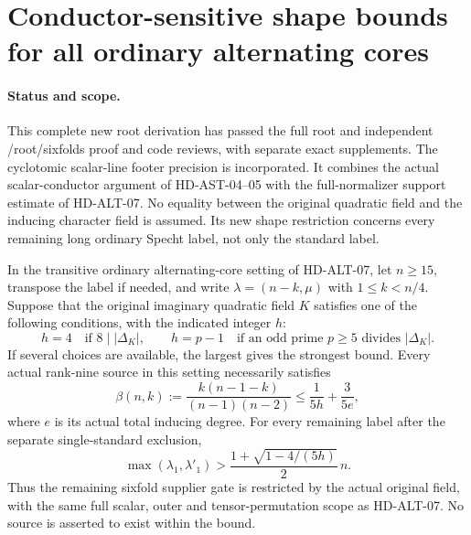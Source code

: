 \section{Conductor-sensitive shape bounds for all ordinary alternating cores}
\label{sec:ordinary-alternating-conductor}

\paragraph{Status and scope.}
This complete new root derivation has passed the full root and
independent /root/sixfolds proof and code reviews, with separate exact
supplements. The cyclotomic scalar-line footer precision is incorporated. It combines the actual scalar-conductor argument of HD-AST-04--05
with the full-normalizer support estimate of HD-ALT-07. No equality
between the original quadratic field and the inducing character field
is assumed. Its new shape restriction concerns every remaining long
ordinary Specht label, not only the standard label.

\begin{theorem}
\label{HD-ALT-08}
In the transitive ordinary alternating-core setting of HD-ALT-07, let
$n\ge15$, transpose the label if needed, and write
$\lambda=(n-k,\mu)$ with $1\le k<n/4$.
Suppose that the original imaginary quadratic field $K$ satisfies
one of the following conditions, with the indicated integer $h$:
\[
 h=4\quad\text{if }8\mid|\Delta_K|,
 \qquad h=p-1\quad\text{if an odd prime }p\ge5
                         \text{ divides }|\Delta_K|.
 \tag{AC.1}
\]
If several choices are available, the largest gives the strongest bound.
Every actual rank-nine source in this setting necessarily satisfies
\[
 \beta(n,k):=\frac{k(n-1-k)}{(n-1)(n-2)}
                     \le\frac1{5h}+\frac3{5e},
 \tag{AC.2}
\]
where $e$ is its actual total inducing degree.
For every remaining label after the separate single-standard exclusion,
\[
 \max(\lambda_1,\lambda'_1)>
          \frac{1+\sqrt{1-4/(5h)}}2\,n.
 \tag{AC.3}
\]
Thus the remaining sixfold supplier gate is restricted by the actual
original field, with the same full scalar, outer and tensor-permutation
scope as HD-ALT-07. No source is asserted to exist within the bound.
\end{theorem}

